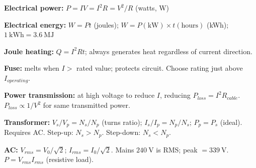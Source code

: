 \begin{summarybox}
\textbf{Electrical power:}
$P = IV = I^2R = V^2/R$ (watts, W)

\textbf{Electrical energy:}
$W = Pt$ (joules); $W = P(\text{kW}) \times t(\text{hours})$
(kWh); $1\ \text{kWh} = 3.6\ \text{MJ}$

\textbf{Joule heating:} $Q = I^2Rt$;
always generates heat regardless of current direction.

\textbf{Fuse:} melts when $I > $ rated value;
protects circuit. Choose rating just above $I_{operating}$.

\textbf{Power transmission:} at high voltage to
reduce $I$, reducing $P_{loss} = I^2R_{cable}$.
$P_{loss} \propto 1/V^2$ for same transmitted power.

\textbf{Transformer:}
$V_s/V_p = N_s/N_p$ (turns ratio);
$I_s/I_p = N_p/N_s$;
$P_p = P_s$ (ideal).
Requires AC. Step-up: $N_s > N_p$.
Step-down: $N_s < N_p$.

\textbf{AC:} $V_{rms} = V_0/\sqrt{2}$;
$I_{rms} = I_0/\sqrt{2}$.
Mains $240\ \text{V}$ is RMS; peak $= 339\ \text{V}$.
$P = V_{rms}I_{rms}$ (resistive load).
\end{summarybox}

